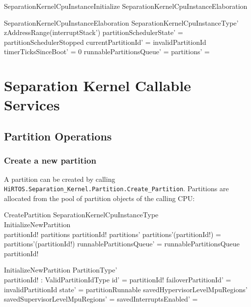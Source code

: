 \documentclass[11pt,letterpaper,twoside,openany]{book}
\begin{document}
\begin{schema}{SeparationKernelCpuInstanceInitialize}
   SeparationKernelCpuInstanceElaboration
\end{schema}

\begin{schema}{SeparationKernelCpuInstanceElaboration}
   SeparationKernelCpuInstanceType'
\where
   zAddressRange(interruptStack') \neq \emptyset
\also
    partitionSchedulerState' = partitionSchedulerStopped
\also
   currentPartitionId' = invalidPartitionId
\also
   timerTicksSinceBoot' = 0
\also
   runnablePartitionsQueue' = \langle \rangle
\also
   partitions' = \emptyset
\end{schema}

\section{Separation Kernel Callable Services}

\subsection{Partition Operations}

\subsubsection{Create a new partition}

A partition can be created by calling \verb`HiRTOS.Separation_Kernel.Partition.Create_Partition`.
Partitions are allocated from the pool of partition objects of the calling CPU:

\begin{schema}{CreatePartition}
   \Delta SeparationKernelCpuInstanceType \\
   InitializeNewPartition \\
\where
   partitionId! \notin \dom partitions
\also
   partitionId! \in \dom partitions'
\also
   partitions'(partitionId!) = partitions'(partitionId!)
\also
   runnablePartitionsQueue' = runnablePartitionsQueue \cat \langle partitionId! \rangle
\end{schema}

\begin{schema}{InitializeNewPartition}
   PartitionType' \\
   partitionId! : ValidPartitionIdType
\where
   id' = partitionId!
\also
   failoverPartitionId' = invalidPartitionId
\also
   state' = partitionRunnable
\also
   savedHypervisorLevelMpuRegions' \neq \emptyset
\also
   savedSupervisorLevelMpuRegions' = \emptyset
\also
   savedInterruptsEnabled' = \emptyset
\end{schema}
\end{document}
